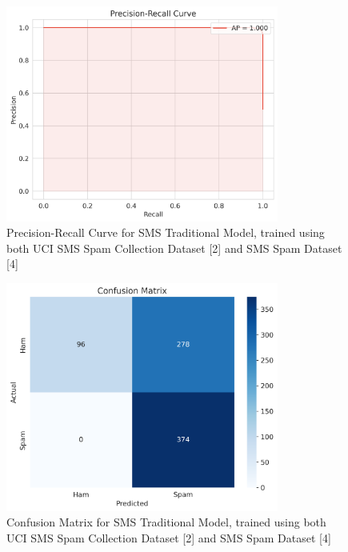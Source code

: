 \documentclass{article}
\begin{document}
\begin{figure}[htbp]
    \centering
    \includegraphics[width=0.8\textwidth]{../analysis/sms/traditional/precision_recall_curve.png}
    \caption{Precision-Recall Curve for SMS Traditional Model, trained using both UCI SMS Spam Collection Dataset [2] and SMS Spam Dataset [4]}
    \label{fig:precision_recall_curve_6}
\end{figure}

\begin{figure}[htbp]
    \centering
    \includegraphics[width=0.8\textwidth]{../analysis/sms/traditional/confusion_matrix.png}
    \caption{Confusion Matrix for SMS Traditional Model, trained using both UCI SMS Spam Collection Dataset [2] and SMS Spam Dataset [4]}
    \label{fig:confusion_matrix_6}
\end{figure}
\end{document}
